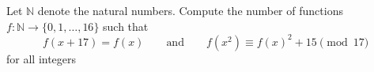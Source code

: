 Let $\mathbb{N}$ denote the natural numbers. Compute the number of functions $f:\mathbb{N}\rightarrow \{0, 1, \dots, 16\}$ such that $$f(x+17)=f(x)\qquad \text{and} \qquad f(x^2)\equiv f(x)^2+15 \pmod {17}$$for all integers 